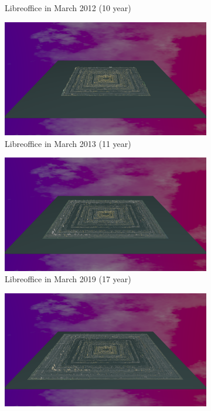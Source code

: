 \begin{figure}[ht]
\begin{subfigure}{0.48\textwidth}
        \caption{Libreoffice in March 2012 (10 year)} 
        \label{fig:Libre_V6_S3}
    \end{subfigure}\hspace*{\fill}
    \begin{subfigure}{0.48\textwidth}
        \includegraphics[width=\linewidth]{Libreoffice/Animation011.png}
        \caption{Libreoffice in March 2013 (11 year)} 
        \label{fig:Libre_V6_S4}
    \end{subfigure}
    \medskip
    \begin{subfigure}{0.48\textwidth}
        \includegraphics[width=\linewidth]{Libreoffice/Animation017.png}
        \caption{Libreoffice in March 2019 (17 year)} 
        \label{fig:Libre_V6_S5}
    \end{subfigure}\hspace*{\fill}
    \begin{subfigure}{0.48\textwidth}
        \includegraphics[width=\linewidth]{Libreoffice/Animation021.png}

\end{subfigure}
\end{figure}
